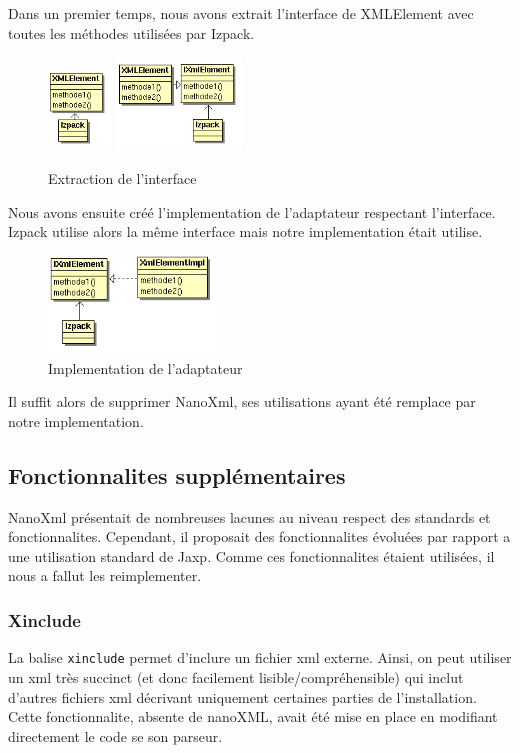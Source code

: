 Dans un premier temps, nous avons extrait l'interface de XMLElement avec toutes les méthodes utilisées par Izpack.
\begin{figure}[H]
	\centering
	\includegraphics[width=0.15\textwidth]{../image/sol_casInitial.png}
	\hfil
	\includegraphics[width=0.3\textwidth]{../image/sol_extractionInterface.png}
	\caption{Extraction de l'interface}
\end{figure}
Nous avons ensuite créé l'implementation de l'adaptateur respectant l'interface. Izpack utilise alors la même interface mais notre implementation était utilise. 
\begin{figure}[H]
	\centering
	\includegraphics[width=0.4\textwidth]{../image/sol_implementation.png}
	\caption{Implementation de l'adaptateur}
\end{figure}
Il suffit alors de supprimer NanoXml, ses utilisations ayant été remplace par notre implementation.
\subsection{Fonctionnalites supplémentaires}
NanoXml présentait de nombreuses lacunes au niveau respect des standards et fonctionnalites. Cependant, il proposait des fonctionnalites évoluées par rapport a une utilisation standard de Jaxp. Comme ces fonctionnalites étaient utilisées, il nous a fallut les reimplementer.
\subsubsection{Xinclude}
La balise \verb|xinclude| permet d'inclure un fichier xml externe. Ainsi, on peut utiliser un xml très succinct (et donc facilement lisible/compréhensible) qui inclut d'autres fichiers xml décrivant uniquement certaines parties de l'installation. Cette fonctionnalite, absente de nanoXML, avait été mise en place en modifiant directement le code se son parseur.

